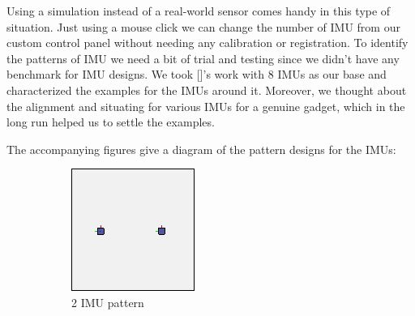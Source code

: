 Using a simulation instead of a real-world sensor comes handy in this type of situation. Just using a mouse click we can change the number of IMU from our custom control panel without needing any calibration or registration. To identify the patterns of IMU we need a bit of trial and testing since we didn't have any benchmark for IMU designs. We took []'s work with 8 IMUs as our base and characterized the examples for the IMUs around it. Moreover, we thought about the alignment and situating for various IMUs for a genuine gadget, which in the long run helped us to settle the examples. 

The accompanying figures give a diagram of the pattern designs for the IMUs:

\begin{figure}[h!]
  \centering
  \begin{subfigure}[b]{0.2\linewidth}
    \includegraphics[width=\linewidth]{figures/IMU2.png}
    \caption{2 IMU pattern }
  \end{subfigure}
\begin{subfigure}[b]{0.2\linewidth}

\end{subfigure}
\end{figure}
